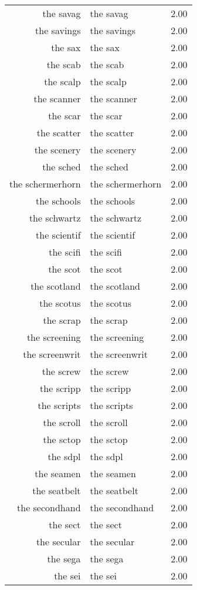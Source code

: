 \begin{table}[ht]
\begin{tabular}{rlr}
  the savag & the savag & 2.00 \\ 
  the savings & the savings & 2.00 \\ 
  the sax & the sax & 2.00 \\ 
  the scab & the scab & 2.00 \\ 
  the scalp & the scalp & 2.00 \\ 
  the scanner & the scanner & 2.00 \\ 
  the scar & the scar & 2.00 \\ 
  the scatter & the scatter & 2.00 \\ 
  the scenery & the scenery & 2.00 \\ 
  the sched & the sched & 2.00 \\ 
  the schermerhorn & the schermerhorn & 2.00 \\ 
  the schools & the schools & 2.00 \\ 
  the schwartz & the schwartz & 2.00 \\ 
  the scientif & the scientif & 2.00 \\ 
  the scifi & the scifi & 2.00 \\ 
  the scot & the scot & 2.00 \\ 
  the scotland & the scotland & 2.00 \\ 
  the scotus & the scotus & 2.00 \\ 
  the scrap & the scrap & 2.00 \\ 
  the screening & the screening & 2.00 \\ 
  the screenwrit & the screenwrit & 2.00 \\ 
  the screw & the screw & 2.00 \\ 
  the scripp & the scripp & 2.00 \\ 
  the scripts & the scripts & 2.00 \\ 
  the scroll & the scroll & 2.00 \\ 
  the sctop & the sctop & 2.00 \\ 
  the sdpl & the sdpl & 2.00 \\ 
  the seamen & the seamen & 2.00 \\ 
  the seatbelt & the seatbelt & 2.00 \\ 
  the secondhand & the secondhand & 2.00 \\ 
  the sect & the sect & 2.00 \\ 
  the secular & the secular & 2.00 \\ 
  the sega & the sega & 2.00 \\ 
  the sei & the sei & 2.00 \\ 

\end{tabular}
\end{table}
